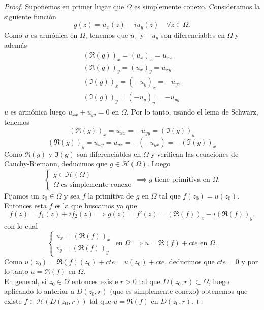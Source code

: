 \begin{proof}
    Suponemos en primer lugar que $\Omega$ es simplemente conexo. Consideramos la siguiente función
    \[
        g(z) = u_x(z) - iu_y(z) \quad \forall z \in \Omega.
    \]
    Como $u$ es armónica en $\Omega$, tenemos que $u_x$ y $-u_y$ son diferenciables en $\Omega$ y además
    \[  
        \begin{matrix}
            (\Re(g))_x = (u_x)_x = u_{xx} \\
            (\Re(g))_y = (u_x)_y = u_{xy} \\
            (\Im(g))_x = (-u_y)_x = -u_{yx} \\
            (\Im(g))_y = (-u_y)_y = -u_{yy}
        \end{matrix}
    \]
    $u$ es armónica luego $u_{xx} + u_{yy} = 0$ en $\Omega$. Por lo tanto, usando el lema de Schwarz, tenemos
    \[
        (\Re(g))_x = u_{xx} = -u_{yy} = (\Im(g))_y
    \]
    \[
        (\Re(g))_y = u_{xy} = u_{yx} = -(-u_{yx}) = -(\Im(g))_x
    \]
    Como $\Re(g)$ y $\Im(g)$ son diferenciables en $\Omega$ y verifican las ecuaciones de Cauchy-Riemann, deducimos que $g \in \mathcal{H}(\Omega)$.
    Luego 
    \[
        \begin{cases}
            g \in \mathcal{H}(\Omega) \\
            \Omega \text{ es simplemente conexo}
        \end{cases} \implies g \text{ tiene primitiva en } \Omega. 
    \]
    Fijamos un $z_0 \in \Omega$ y sea $f$ la primitiva de $g$ en $\Omega$ tal que $f(z_0) = u(z_0)$. Entonces esta $f$ es la que buscamos ya que 
    \[
        f(z) = f_1(z) + if_2(z) \implies g(z) = f'(z) = (\Re(f))_x - i(\Re(f))_y.
    \]
    con lo cual
    \[
        \begin{cases}
            u_x = (\Re(f))_x \\
            v_y = (\Re(f))_y
        \end{cases} \text{ en } \Omega \implies u = \Re(f) + cte \text{ en } \Omega.
    \]
    Como $u(z_0) = \Re(f)(z_0) + cte = u(z_0) + cte$, deducimos que $cte = 0$ y por lo tanto $u = \Re(f)$ en $\Omega$.\\
    En general, si $z_0 \in \Omega$ entonces existe $r > 0$ tal que $D(z_0,r) \subset \Omega$, luego aplicando lo anterior a $D(z_0,r)$ (que es simplemente conexo) obtenemos que existe $f \in \mathcal{H}(D(z_0,r))$ tal que $u = \Re(f)$ en $D(z_0,r)$.
\end{proof}

